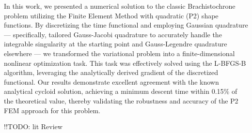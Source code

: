 \documentclass[11pt]{article}
\begin{document}
In this work, we presented a numerical solution to the classic Brachistochrone problem utilizing the Finite Element Method with quadratic (P2) shape functions. By discretizing the time functional and employing Gaussian quadrature --- specifically, tailored Gauss-Jacobi quadrature to accurately handle the integrable singularity at the starting point and Gauss-Legendre quadrature elsewhere --- we transformed the variational problem into a finite-dimensional nonlinear optimization task. This task was effectively solved using the L-BFGS-B algorithm, leveraging the analytically derived gradient of the discretized functional. Our results demonstrate excellent agreement with the known analytical cycloid solution, achieving a minimum descent time within 0.15\% of the theoretical value, thereby validating the robustness and accuracy of the P2 FEM approach for this problem.


!!TODO: lit Review



 





\newpage
\end{document}

